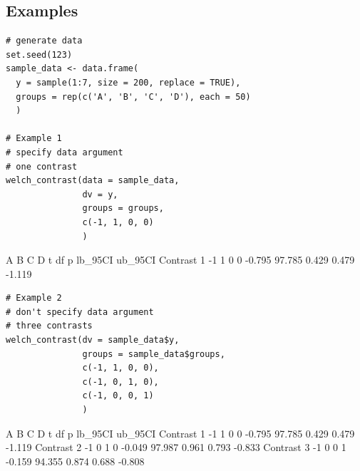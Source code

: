 \documentclass[man, noextraspace, apacite, floatsintext]{apa6}
\begin{document}
\subsection{Examples}
\begin{small}
\begin{singlespace}
\begin{lstlisting}
# generate data
set.seed(123)
sample_data <- data.frame(
  y = sample(1:7, size = 200, replace = TRUE),
  groups = rep(c('A', 'B', 'C', 'D'), each = 50)
  )

# Example 1  
# specify data argument
# one contrast
welch_contrast(data = sample_data, 
               dv = y, 
               groups = groups, 
               c(-1, 1, 0, 0)
               )
\end{lstlisting}
\begin{Schunk}
\begin{Soutput}
            A B C D      t     df     p lb_95CI ub_95CI
Contrast 1 -1 1 0 0 -0.795 97.785 0.429   0.479  -1.119
\end{Soutput}
\end{Schunk}
\begin{lstlisting}
# Example 2
# don't specify data argument
# three contrasts
welch_contrast(dv = sample_data$y, 
               groups = sample_data$groups, 
               c(-1, 1, 0, 0),
               c(-1, 0, 1, 0),
               c(-1, 0, 0, 1)
               )
\end{lstlisting}
\begin{Schunk}
\begin{Soutput}
            A B C D      t     df     p lb_95CI ub_95CI
Contrast 1 -1 1 0 0 -0.795 97.785 0.429   0.479  -1.119
Contrast 2 -1 0 1 0 -0.049 97.987 0.961   0.793  -0.833
Contrast 3 -1 0 0 1 -0.159 94.355 0.874   0.688  -0.808
\end{Soutput}
\end{Schunk}
\end{singlespace}
\end{small}
\end{document}
